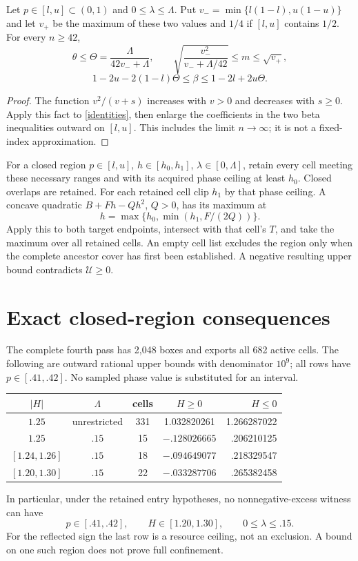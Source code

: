 \documentclass[11pt]{article}
\begin{document}
\begin{lemma}\label{filter}
Let $p\in[l,u]\subset(0,1)$ and $0\le\lambda\le\Lambda$.
Put $v_-=\min\{l(1-l),u(1-u)\}$ and let $v_+$ be the maximum of
these two values and $1/4$ if $[l,u]$ contains $1/2$.
For every $n\ge42$,
\[
 \theta\le\Theta=\frac{\Lambda}{42v_-+\Lambda},\qquad
 \sqrt{\frac{v_-^2}{v_-+\Lambda/42}}\le m\le\sqrt{v_+},
\]
\[
 1-2u-2(1-l)\Theta\le\beta\le1-2l+2u\Theta .
\]
\end{lemma}
\begin{proof}
The function $v^2/(v+s)$ increases with $v>0$ and decreases with $s\ge0$.
Apply this fact to \eqref{identities}, then enlarge the coefficients in
the two beta inequalities outward on $[l,u]$.
This includes the limit $n\to\infty$; it is not a fixed-index approximation.
\end{proof}

For a closed region $p\in[l,u]$, $h\in[h_0,h_1]$, $\lambda\in[0,\Lambda]$,
retain every cell meeting these necessary ranges and with its acquired
phase ceiling at least $h_0$. Closed overlaps are retained.
For each retained cell clip $h_1$ by that phase ceiling.
A concave quadratic $B+Fh-Qh^2$, $Q>0$, has its maximum at
\[
 h=\max\{h_0,\min(h_1,F/(2Q))\}.
\]
Apply this to both target endpoints, intersect with that cell's $T$,
and take the maximum over all retained cells.
An empty cell list excludes the region only when the complete ancestor
cover has first been established. A negative resulting upper bound
contradicts $\mathcal U\ge0$.

\section{Exact closed-region consequences}
The complete fourth pass has 2,048 boxes and exports all 682 active cells.
The following are outward rational upper bounds with denominator $10^9$;
all rows have $p\in[.41,.42]$. No sampled phase value is substituted for
an interval.
\begin{center}
\begin{tabular}{ccccr}\toprule
$|H|$ & $\Lambda$ & cells & $H\ge0$ & $H\le0$\\\midrule
$1.25$ & unrestricted &331&1.032820261&1.266287022\\
$1.25$ & $.15$ &15&$-.128026665$&.206210125\\
$[1.24,1.26]$ & $.15$ &18&$-.094649077$&.218329547\\
$[1.20,1.30]$ & $.15$ &22&$-.033287706$&.265382458\\\bottomrule
\end{tabular}
\end{center}
In particular, under the retained entry hypotheses, no nonnegative-excess
witness can have
\[
 p\in[.41,.42],\qquad H\in[1.20,1.30],\qquad 0\le\lambda\le.15.
\]
For the reflected sign the last row is a resource ceiling, not an
exclusion. A bound on one such region does not prove full confinement.
\end{document}
